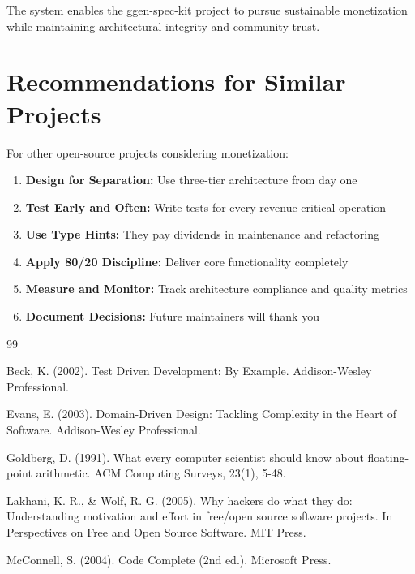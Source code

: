 \documentclass[12pt]{report}
\begin{document}
The system enables the ggen-spec-kit project to pursue sustainable monetization while maintaining architectural integrity and community trust.

\section{Recommendations for Similar Projects}

For other open-source projects considering monetization:

\begin{enumerate}
    \item \textbf{Design for Separation:} Use three-tier architecture from day one
    \item \textbf{Test Early and Often:} Write tests for every revenue-critical operation
    \item \textbf{Use Type Hints:} They pay dividends in maintenance and refactoring
    \item \textbf{Apply 80/20 Discipline:} Deliver core functionality completely
    \item \textbf{Measure and Monitor:} Track architecture compliance and quality metrics
    \item \textbf{Document Decisions:} Future maintainers will thank you
\end{enumerate}

\newpage

\begin{thebibliography}{99}

Beck, K. (2002). Test Driven Development: By Example. Addison-Wesley Professional.

Evans, E. (2003). Domain-Driven Design: Tackling Complexity in the Heart of Software. Addison-Wesley Professional.

Goldberg, D. (1991). What every computer scientist should know about floating-point arithmetic. ACM Computing Surveys, 23(1), 5-48.

Lakhani, K. R., \& Wolf, R. G. (2005). Why hackers do what they do: Understanding motivation and effort in free/open source software projects. In Perspectives on Free and Open Source Software. MIT Press.

McConnell, S. (2004). Code Complete (2nd ed.). Microsoft Press.

\end{thebibliography}
\end{document}

